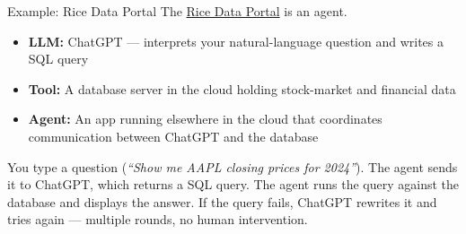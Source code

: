 \documentclass[aspectratio=169]{beamer}
\begin{document}
\begin{frame}{Example: Rice Data Portal}
The \href{https://data-portal.rice-business.org}{Rice Data Portal} is an agent.
\vspace{0.3cm}
\begin{itemize}
  \item \textbf{LLM:} ChatGPT --- interprets your natural-language question and writes a SQL query
  \item \textbf{Tool:} A database server in the cloud holding stock-market and financial data
  \item \textbf{Agent:} An app running elsewhere in the cloud that coordinates communication between ChatGPT and the database
\end{itemize}
\vspace{0.3cm}
You type a question (\textit{``Show me AAPL closing prices for 2024''}).  The agent sends it to ChatGPT, which returns a SQL query.  The agent runs the query against the database and displays the answer.  If the query fails, ChatGPT rewrites it and tries again --- multiple rounds, no human intervention.
\end{frame}
\end{document}
